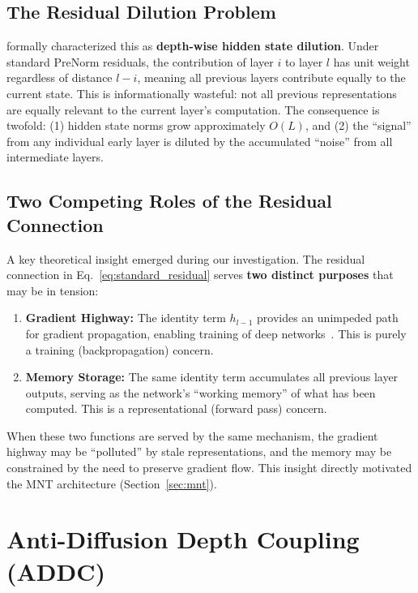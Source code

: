 \documentclass[10pt]{article}
\begin{document}
\subsection{The Residual Dilution Problem}

\cite{kimiteam2026attnres} formally characterized this as \textbf{depth-wise hidden state dilution}. Under standard PreNorm residuals, the contribution of layer $i$ to layer $l$ has unit weight regardless of distance $l-i$, meaning all previous layers contribute equally to the current state. This is informationally wasteful: not all previous representations are equally relevant to the current layer's computation. The consequence is twofold: (1) hidden state norms grow approximately $O(L)$, and (2) the ``signal'' from any individual early layer is diluted by the accumulated ``noise'' from all intermediate layers.

\subsection{Two Competing Roles of the Residual Connection}

A key theoretical insight emerged during our investigation. The residual connection in Eq.~\eqref{eq:standard_residual} serves \textbf{two distinct purposes} that may be in tension:

\begin{enumerate}[leftmargin=*,itemsep=2pt]
    \item \textbf{Gradient Highway:} The identity term $h_{l-1}$ provides an unimpeded path for gradient propagation, enabling training of deep networks~\cite{he2016deep}. This is purely a training (backpropagation) concern.
    \item \textbf{Memory Storage:} The same identity term accumulates all previous layer outputs, serving as the network's ``working memory'' of what has been computed. This is a representational (forward pass) concern.
\end{enumerate}

When these two functions are served by the same mechanism, the gradient highway may be ``polluted'' by stale representations, and the memory may be constrained by the need to preserve gradient flow. This insight directly motivated the MNT architecture (Section~\ref{sec:mnt}).

\section{Anti-Diffusion Depth Coupling (ADDC)}
\label{sec:addc}
\end{document}
